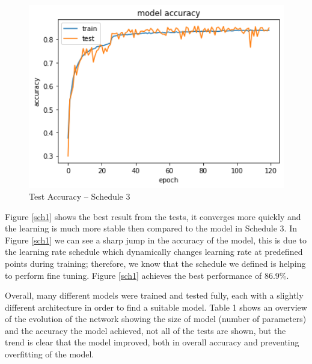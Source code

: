 \documentclass[12pt]{article}
\begin{document}
\begin{figure}[htbp]
\begin{minipage}{0.33\textwidth}
  \end{minipage}\hfill
  \begin{minipage}{0.33\textwidth}
    \centering
    \includegraphics[width=1\textwidth]{results/acc-8.png} %
    \caption{Test Accuracy -- Schedule 3}
    \label{sch3}
  \end{minipage}
\end{figure}

Figure \ref{sch1} shows the best result from the tests, it converges more quickly and the learning is much more stable then compared to the model in Schedule 3. In Figure \ref{sch1} we can see a sharp jump in the accuracy of the model, this is due to the learning rate schedule which dynamically changes learning rate at predefined points during training; therefore, we know that the schedule we defined is helping to perform fine tuning. Figure \ref{sch1} achieves the best performance of 86.9\%.

Overall, many different models were trained and tested fully, each with a slightly different architecture in order to find a suitable model. Table 1 shows an overview of the evolution of the network showing the size of model (number of parameters) and the accuracy the model achieved, not all of the tests are shown, but the trend is clear that the model improved, both in overall accuracy and preventing overfitting of the model.
\end{document}

